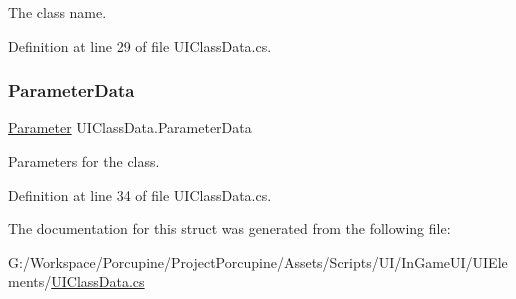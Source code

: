 The class name. 



Definition at line 29 of file U\+I\+Class\+Data.\+cs.

\mbox{\label{struct_u_i_class_data_ae0a500c9d9c89a202b3d18e20eb71e0b}} 
\subsubsection{\texorpdfstring{Parameter\+Data}{ParameterData}}
{\footnotesize\ttfamily \hyperlink{class_parameter}{Parameter} U\+I\+Class\+Data.\+Parameter\+Data\hspace{0.3cm}{\ttfamily [get]}}



Parameters for the class. 



Definition at line 34 of file U\+I\+Class\+Data.\+cs.



The documentation for this struct was generated from the following file\+:\begin{DoxyCompactItemize}
\item 
G\+:/\+Workspace/\+Porcupine/\+Project\+Porcupine/\+Assets/\+Scripts/\+U\+I/\+In\+Game\+U\+I/\+U\+I\+Elements/\hyperlink{_u_i_class_data_8cs}{U\+I\+Class\+Data.\+cs}\end{DoxyCompactItemize}
